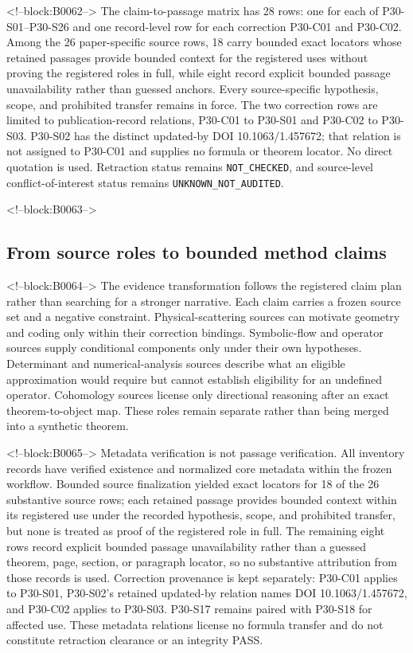 \documentclass[11pt,a4paper]{article}
\begin{document}
<!--block:B0062-->
The claim-to-passage matrix has 28 rows: one for each of P30-S01--P30-S26 and
one record-level row for each correction P30-C01 and P30-C02. Among the 26
paper-specific source rows, 18 carry bounded exact locators whose retained
passages provide bounded context for the registered uses without proving the
registered roles in full, while eight record explicit bounded passage
unavailability rather than guessed anchors. Every source-specific hypothesis,
scope, and prohibited transfer remains in force. The two correction rows are
limited to publication-record relations, P30-C01 to P30-S01 and P30-C02 to
P30-S03. P30-S02 has the distinct updated-by DOI 10.1063/1.457672; that relation
is not assigned to P30-C01 and supplies no formula or theorem locator.
No direct quotation is used. Retraction status remains
\texttt{NOT\_\allowbreak CHECKED}, and source-level conflict-of-interest
status remains \texttt{UNKNOWN\_\allowbreak NOT\_\allowbreak AUDITED}.

<!--block:B0063-->
\subsection{From source roles to bounded method claims}

<!--block:B0064-->
The evidence transformation follows the registered claim plan rather than
searching for a stronger narrative.  Each claim carries a frozen source set
and a negative constraint.  Physical-scattering sources can motivate geometry
and coding only within their correction bindings.  Symbolic-flow and operator
sources supply conditional components only under their own hypotheses.
Determinant and numerical-analysis sources describe what an eligible
approximation would require but cannot establish eligibility for an undefined
operator.  Cohomology sources license only directional reasoning after an exact
theorem-to-object map.  These roles remain separate rather than being merged
into a synthetic theorem.

<!--block:B0065-->
Metadata verification is not passage verification. All inventory records have verified existence and normalized core metadata within the frozen workflow. Bounded source finalization yielded exact locators for 18 of the 26 substantive source rows; each retained passage provides bounded context within its registered use under the recorded hypothesis, scope, and prohibited transfer, but none is treated as proof of the registered role in full. The remaining eight rows record explicit bounded passage unavailability rather than a guessed theorem, page, section, or paragraph locator, so no substantive attribution from those records is used. Correction provenance is kept separately: P30-C01 applies to P30-S01, P30-S02's retained updated-by relation names DOI 10.1063/1.457672, and P30-C02 applies to P30-S03. P30-S17 remains paired with P30-S18 for affected use. These metadata relations license no formula transfer and do not constitute retraction clearance or an integrity PASS.
\end{document}
